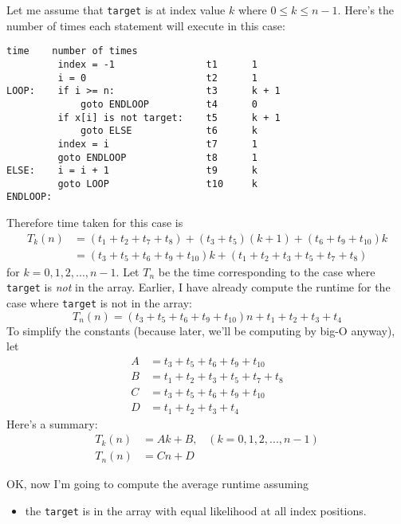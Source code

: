 Let me assume that \verb!target! is at index value $k$
where $0 \leq k \leq n - 1$.
Here's the number of times each statement will execute in this case:
\begin{Verbatim}[frame=single, fontsize=\footnotesize]
                                   time    number of times   
         index = -1                t1      1
         i = 0                     t2      1
LOOP:    if i >= n:                t3      k + 1
             goto ENDLOOP          t4      0
         if x[i] is not target:    t5      k + 1 
             goto ELSE             t6      k 
         index = i                 t7      1
         goto ENDLOOP              t8      1
ELSE:    i = i + 1                 t9      k
         goto LOOP                 t10     k
ENDLOOP:
\end{Verbatim}
Therefore time taken for this case is
\begin{align*}
T_k(n)
  &= (t_1 + t_2 + t_7 + t_8)
    + (t_3 + t_5)(k + 1)
    + (t_6 + t_9 + t_{10})k \\
  &= (t_3 + t_5 + t_6 + t_9 + t_{10}) k
    + (t_1 + t_2 + t_3 + t_5 + t_7 + t_8)
\end{align*}
for $k = 0, 1, 2, ..., n - 1$.
Let $T_n$ be the time corresponding to the case where
\verb!target! is \textit{not} in the array.
Earlier, I have already compute the runtime for the case where 
\verb!target! is not in the array:
\[
  T_n(n) =
  (t_3 + t_5 + 
    t_6  + 
    t_9 +
    t_{10}
    )n
    +
    t_1 + 
    t_2 + 
    t_3 + 
    t_4
\]
To simplify the constants 
(because later, we'll be computing by big-O anyway),
let
\begin{align*}
A &= t_3 + t_5 + t_6 + t_9 + t_{10} \\
B &= t_1 + t_2 + t_3 + t_5 + t_7 + t_8 \\
C &= t_3 + t_5 + 
    t_6  + 
    t_9 +
    t_{10} \\
D &= t_1 + 
    t_2 + 
    t_3 + 
    t_4
\end{align*}
Here's a summary:
\begin{align*}
T_k(n) &= Ak + B, \,\,\,\,\,(k = 0, 1, 2,..., n - 1) \\
T_n(n) &= Cn + D
\end{align*}

OK, now I'm going to compute the average runtime
assuming 
\begin{itemize}
\item the \verb!target! is in the array with equal likelihood
at all index positions.
\end{itemize}

